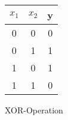 \begin{figure}[ht]
    \centering
    \begin{tabular}{|c|c|c|}
        \hline
        $x_1$ & $x_2$ & y \\
        \hline
        0 & 0 & 0 \\
        \hline
        0 & 1 & 1 \\
        \hline
        1 & 0 & 1 \\
        \hline
        1 & 1 & 0 \\
        \hline
    \end{tabular}
    \caption{XOR-Operation}
\end{figure}
